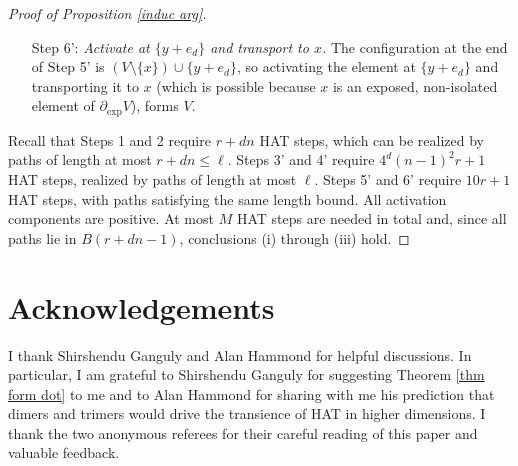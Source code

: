 \documentclass[11pt,reqno]{amsart}
\theoremstyle{definition}
\numberwithin{equation}{section}
\newcommand{\1}{\mathbf{1}}
\newcommand{\bdye}{\partial_{\mathrm{exp}}}
\newcommand{\cc}{\mathsf{c}}
\begin{document}
\begin{proof}[Proof of Proposition \ref{induc arg}]
\begin{itemize}
Consequently, it is possible to treadmill the pair $\{w-e_1,w-2e_1\}$ to:
\begin{itemize}
\item $B(r+3)^\cc$ without leaving $O_1$; then
\item $O_2$ without leaving $B(r+6) {\setminus} B(r + 3)$; and
\item $\{y,y+e_d\}$ without leaving $O_2$.
\end{itemize}
This requires at most $f_2 = 10 r$ HAT steps, each of which has a positive activation component and a transport component realized by a random walk path of length five.

\item[Step 6':] {\em Activate at $\{y+e_d\}$ and transport to $x$.} The configuration at the end of Step 5' is $(V {\setminus} \{x\}) \cup \{y+e_d\}$, so activating the element at $\{y+e_d\}$ and transporting it to $x$ (which is possible because $x$ is an exposed, non-isolated element of $\bdye V$), forms $V$.  
\end{itemize}

Recall that Steps 1 and 2 require $r+dn$ HAT steps, which can be realized by paths of length at most $r+dn \leq \ell$. Steps 3' and 4' require $4^d(n-1)^2r + 1$ HAT steps, realized by paths of length at most $\ell$. Steps 5' and 6' require $10r+1$ HAT steps, with paths satisfying the same length bound. All activation components are positive. At most $M$ HAT steps are needed in total and, since all paths lie in $B(r+dn-1)$, conclusions (i) through (iii) hold.
\end{proof}



\section*{Acknowledgements}

I thank Shirshendu Ganguly and Alan Hammond for helpful discussions. In particular, I am grateful to Shirshendu Ganguly for suggesting Theorem \ref{thm form dot} to me and to Alan Hammond for sharing with me his prediction that dimers and trimers would drive the transience of HAT in higher dimensions. I thank the two anonymous referees for their careful reading of this paper and valuable feedback.

% 
% 
\end{document}
